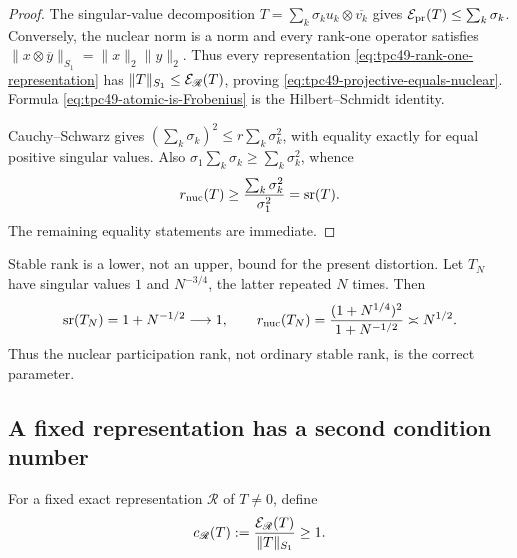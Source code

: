 \begin{proof}
The singular-value decomposition
\(T=\sum_k\sigma_ku_k\otimes\overline{v_k}\) gives
\(\mathcal E_{\rm pr}(T)\le\sum_k\sigma_k\).  Conversely, the nuclear norm is
a norm and every rank-one operator satisfies
\(\|x\otimes\overline y\|_{S_1}=\|x\|_2\|y\|_2\).  Thus every
representation \eqref{eq:tpc49-rank-one-representation} has
\(\|T\|_{S_1}\le\mathcal E_{\mathscr R}(T)\), proving
\eqref{eq:tpc49-projective-equals-nuclear}.  Formula
\eqref{eq:tpc49-atomic-is-Frobenius} is the Hilbert--Schmidt identity.

Cauchy--Schwarz gives
\((\sum_k\sigma_k)^2\le r\sum_k\sigma_k^2\), with equality exactly
for equal positive singular values.  Also
\(\sigma_1\sum_k\sigma_k\ge\sum_k\sigma_k^2\), whence
\begin{equation}
 r_{\rm nuc}(T)
 \ge\frac{\sum_k\sigma_k^2}{\sigma_1^2}
 =\operatorname{sr}(T).
 \label{eq:tpc49-stable-lower-proof}
\end{equation}
The remaining equality statements are immediate.
\end{proof}

\begin{remark}
\label{rem:tpc49-stable-rank-insufficient}
Stable rank is a lower, not an upper, bound for the present distortion.
Let \(T_N\) have singular values \(1\) and \(N^{-3/4}\), the latter
repeated \(N\) times.  Then
\begin{equation}
 \operatorname{sr}(T_N)=1+N^{-1/2}\longrightarrow1,
 \qquad
 r_{\rm nuc}(T_N)
 =\frac{(1+N^{1/4})^2}{1+N^{-1/2}}
 \asymp N^{1/2}.
 \label{eq:tpc49-stable-rank-counterexample}
\end{equation}
Thus the nuclear participation rank, not ordinary stable rank, is the
correct parameter.
\end{remark}

\subsection{A fixed representation has a second condition number}

\begin{definition}
\label{def:tpc49-representation-condition}
For a fixed exact representation \(\mathscr R\) of \(T\ne0\), define
\begin{equation}
 c_{\mathscr R}(T)
 :=\frac{\mathcal E_{\mathscr R}(T)}{\|T\|_{S_1}}\ge1.
 \label{eq:tpc49-representation-condition}
\end{equation}
\end{definition}

